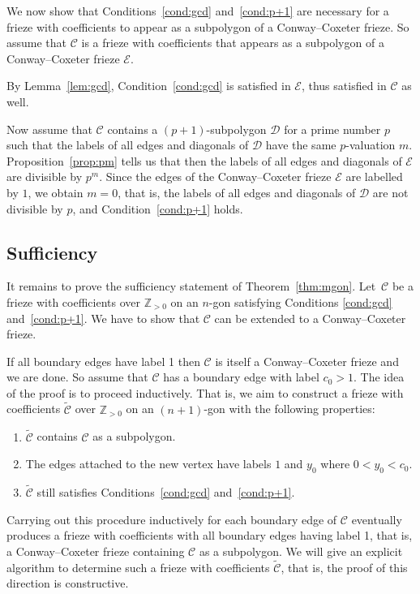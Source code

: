 \documentclass[ALCO,ThmDefs,Unicode,epreuves,published]{cedram}
\numberwithin{equation}{section}
\begin{document}
We now show that Conditions~\eqref{cond:gcd} and~\eqref{cond:p+1} are necessary for a frieze with
coefficients to appear as a subpolygon of a Conway--Coxeter frieze.
So assume that $\mathcal{C}$ is a frieze with coefficients that appears as a subpolygon of a Conway--Coxeter frieze $\mathcal{E}$.

By Lemma~\ref{lem:gcd}, Condition~\eqref{cond:gcd} is satisfied in $\mathcal{E}$, thus satisfied in $\mathcal{C}$ as well.

Now assume that $\mathcal{C}$ contains a $(p+1)$-subpolygon $\mathcal{D}$ for a prime number $p$
such that the labels of all edges and diagonals of $\mathcal{D}$ have the same $p$-valuation $m$.
Proposition~\ref{prop:pm} tells us that then the labels of all edges and
diagonals of $\mathcal{E}$ are divisible by $p^m$. Since the edges of the
Conway--Coxeter frieze $\mathcal{E}$ are labelled by $1$, we obtain $m=0$,
that is, the labels of all edges and diagonals of $\mathcal{D}$ are
not divisible by $p$, and Condition~\eqref{cond:p+1} holds.

\subsection{Sufficiency}

It remains to prove the sufficiency statement of Theorem~\ref{thm:mgon}. Let~$\mathcal{C}$ be a frieze with coefficients over $\mathbb{Z}_{>0}$ on an 
$n$-gon satisfying Conditions \eqref{cond:gcd} and~\eqref{cond:p+1}. We have to show
that $\mathcal{C}$ can be extended to a Conway--Coxeter frieze. 

If all boundary edges have label 1 then $\mathcal{C}$ is itself a Conway--Coxeter
frieze and we are done. So assume that $\mathcal{C}$ has a boundary edge with
label $c_0>1$. 
The idea of the proof is to proceed inductively. That is, we aim to construct
a frieze with coefficients $\widetilde{\mathcal{C}}$ over $\mathbb{Z}_{>0}$ 
on an $(n+1)$-gon with the following properties:
\begin{enumerate}[label=(\roman*)]
 \item %
 $\widetilde{\mathcal{C}}$
 contains $\mathcal{C}$ as a subpolygon. 
 \item %
 The edges attached to the new vertex have labels $1$ and $y_0$ where 
 $0< y_0 < c_0$.
 \item %
 $\widetilde{\mathcal{C}}$ still satisfies Conditions~\eqref{cond:gcd} and~\eqref{cond:p+1}.
\end{enumerate} 
Carrying out this procedure inductively for each boundary edge of $\mathcal{C}$
eventually produces 
a frieze with coefficients with all boundary edges having label 1, that is, a 
Conway--Coxeter frieze containing $\mathcal{C}$ as a subpolygon. We will give an
explicit algorithm to determine such a frieze with coefficients $\widetilde{\mathcal{C}}$,
that is, the proof of this direction is constructive. 
\end{document}
